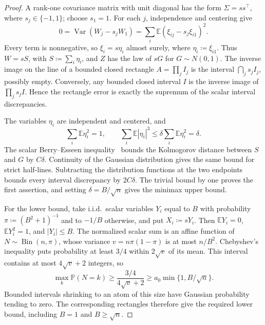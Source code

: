 \documentclass[11pt,letterpaper]{article}
\theoremstyle{remark}
\newcommand{\E}{\mathbb E}
\newcommand{\Pp}{\mathbb P}
\newcommand{\Var}{\operatorname{Var}}
\begin{document}
\begin{proof}
A rank-one covariance matrix with unit diagonal has the form
\(\Sigma=ss^\top\), where \(s_j\in\{-1,1\}\); choose \(s_1=1\).
For each \(j\), independence and centering give
\[
 0=\Var(W_j-s_jW_1)
   =\sum_i\E(\xi_{ij}-s_j\xi_{i1})^2.
\]
Every term is nonnegative, so \(\xi_i=s\eta_i\) almost surely, where
\(\eta_i\coloneqq\xi_{i1}\). Thus \(W=sS\), with
\(S\coloneqq\sum_i\eta_i\), and \(Z\) has the law of \(sG\)
for \(G\sim N(0,1)\).
The inverse image on the line of a bounded closed rectangle
\(A=\prod_j I_j\) is the interval \(\bigcap_j s_j I_j\), possibly empty.
Conversely, any bounded closed interval \(I\) is the inverse image
of \(\prod_j s_j I\). Hence the rectangle error is exactly the
supremum of the scalar interval discrepancies.

The variables \(\eta_i\) are independent and centered, and
\[
 \sum_i\E\eta_i^2=1,\qquad
 \sum_i\E|\eta_i|^3\le\delta\sum_i\E\eta_i^2=\delta.
\]
The scalar Berry--Esseen inequality~\cite{Berry1941} bounds the
Kolmogorov distance between \(S\) and \(G\) by \(C\delta\).
Continuity of the Gaussian distribution gives the same bound for
strict half-lines. Subtracting the distribution functions at the two
endpoints bounds every interval discrepancy by \(2C\delta\).
The trivial bound by one proves the first assertion, and setting
\(\delta=B/\sqrt n\) gives the minimax upper bound.

For the lower bound, take i.i.d.\ scalar variables \(Y_i\) equal to
\(B\) with probability \(\pi\coloneqq(B^2+1)^{-1}\) and to
\(-1/B\) otherwise, and put \(X_i\coloneqq sY_i\). Then
\(\E Y_i=0\), \(\E Y_i^2=1\), and \(|Y_i|\le B\).
The normalized scalar sum is an affine function of
\(N\sim\operatorname{Bin}(n,\pi)\), whose variance
\(v=n\pi(1-\pi)\) is at most \(n/B^2\).
Chebyshev's inequality puts probability at least \(3/4\) within
\(2\sqrt v\) of its mean. This interval contains at most
\(4\sqrt v+2\) integers, so
\[
 \max_k\Pp(N=k)\ge\frac{3/4}{4\sqrt v+2}
 \ge a_0\min\{1,B/\sqrt n\}.
\]
Bounded intervals shrinking to an atom of this size have Gaussian
probability tending to zero. The corresponding rectangles therefore
give the required lower bound, including \(B=1\) and
\(B\ge\sqrt n\).
\end{proof}
\end{document}
